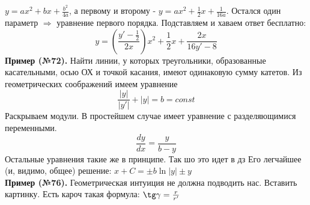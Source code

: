 $y=ax^2+bx+\frac{b^2}{4a}$, а первому и второму - $y=ax^2+\frac{1}{2}x+
\frac{1}{16a}$. Остался один параметр $\Rightarrow$ уравнение первого порядка. 
Подставляем и хаваем ответ бесплатно:
$$y=\left(\frac{y'-\frac{1}{2}}{2x}\right)x^2+\frac{1}{2}x+\frac{2x}{16y'-8}$$ 
\textbf{Пример (№72).} Найти линии, у которых треугольники, образованные 
касательными, осью ОХ и точкой касания, имеют одинаковую сумму катетов. 
Из геометрических соображений имеем уравнение 
$$\frac{|y|}{|y'|}+|y|=b=const$$ 
Раскрываем модули. В простейшем случае имеет уравнение с разделяющимися 
переменными. 
$$\frac{dy}{dx}=\frac{y}{b-y}$$ 
Остальные уравнения такие же в принципе. Так шо это идет в дз 
Его легчайшее (и, видимо, общее) решение: $x+C=\pm b\ln{|y|}\pm y$\\
\textbf{Пример (№76).} Геометрическая интуиция не должна подводить нас. 
Вставить картинку. Есть кароч такая формула: 
$\tg\gamma=\frac{r}{r'}$




